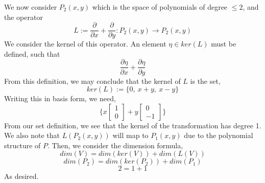 \documentclass[letterpaper,10pt]{article}
\begin{document}
\begin{description}
\begin{enumerate}[label=\alph*.]
\end{enumerate}
We now consider $P_2(x,y)$ which is the space of polynomials of degree $\leq 2$, and the operator
\[L:=\frac{\partial}{\partial x}+\frac{\partial}{\partial y}:P_2(x,y)\to P_2(x,y)\]
We consider the kernel of this operator. An element $\eta\in ker(L)$ must be defined, such that
\[\frac{\partial \eta}{\partial x}+\frac{\partial \eta}{\partial y}\]
From this definition, we may conclude that the kernel of $L$ is the set,
\[ker(L):=\{0,\ x+y,\ x-y\}\]
Writing this in basis form, we need,
\[\{x\begin{bmatrix}
1\\0
\end{bmatrix}+y\begin{bmatrix}
0\\-1
\end{bmatrix}\}\]
From our set definition, we see that the kernel of the transformation has degree 1. We also note that $L(P_2(x,y))$ will map to $P_1(x,y)$ due to the polynomial structure of $P$. Then, we consider the dimension formula,
\[dim(V)=dim(ker(V))+dim(L(V))\]
\[dim(P_2)=dim(ker(P_2))+dim(P_1)\]
\[2=1+1\]
As desired.
\end{description}
\end{document}
